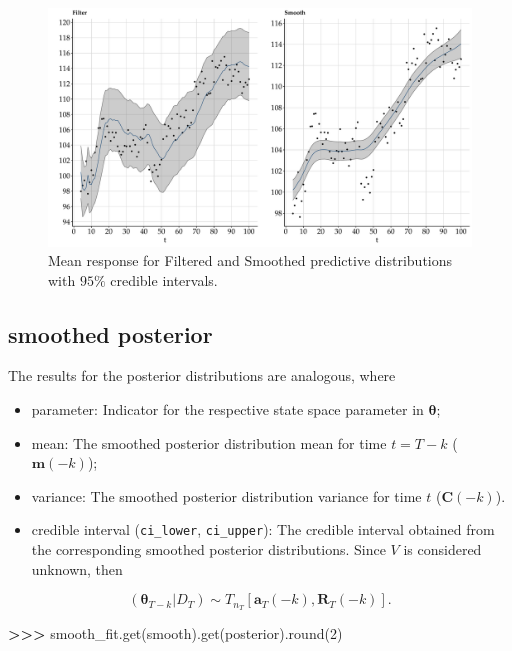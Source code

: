\documentclass[
]{article}
\newenvironment{Shaded}{\begin{snugshade}}{\end{snugshade}}
\newcommand{\BuiltInTok}[1]{#1}
\newcommand{\DecValTok}[1]{\textcolor[rgb]{0.00,0.00,0.81}{#1}}
\newcommand{\NormalTok}[1]{#1}
\newcommand{\OperatorTok}[1]{\textcolor[rgb]{0.81,0.36,0.00}{\textbf{#1}}}
\newcommand{\StringTok}[1]{\textcolor[rgb]{0.31,0.60,0.02}{#1}}
\providecommand{\tightlist}{%
  \setlength{\itemsep}{0pt}\setlength{\parskip}{0pt}}
\begin{document}
\begin{figure}

{\centering \includegraphics[width=0.9\linewidth]{pybats_detection_files/figure-latex/plots for smooth simulated example-1} 

}

\caption{Mean response for Filtered and Smoothed predictive distributions with $95\%$ credible intervals.}\label{fig:plots for smooth simulated example}
\end{figure}

\hypertarget{smoothed-posterior}{%
\subsection{smoothed posterior}\label{smoothed-posterior}}

The results for the posterior distributions are analogous, where

\begin{itemize}
\tightlist
\item
  parameter: Indicator for the respective state space parameter in
  \(\boldsymbol{\theta}\);
\item
  mean: The smoothed posterior distribution mean for time \(t=T-k\)
  (\(\mathbf{m}(-k)\));
\item
  variance: The smoothed posterior distribution variance for time \(t\)
  (\(\mathbf{C}(-k)\)).
\item
  credible interval (\texttt{ci\_lower}, \texttt{ci\_upper}): The
  credible interval obtained from the corresponding smoothed posterior
  distributions. Since \(V\) is considered unknown, then
\end{itemize}

\[
(\boldsymbol{\theta}_{T-k} \vert D_T) \sim T_{n_T}[\mathbf{a}_T(-k), \mathbf{R}_T(-k)].
\]

\begin{Shaded}
\begin{Highlighting}[]
\OperatorTok{\textgreater{}\textgreater{}\textgreater{}}\NormalTok{ smooth\_fit.get(}\StringTok{\textquotesingle{}smooth\textquotesingle{}}\NormalTok{).get(}\StringTok{\textquotesingle{}posterior\textquotesingle{}}\NormalTok{).}\BuiltInTok{round}\NormalTok{(}\DecValTok{2}\NormalTok{)}
\end{Highlighting}
\end{Shaded}
\end{document}
